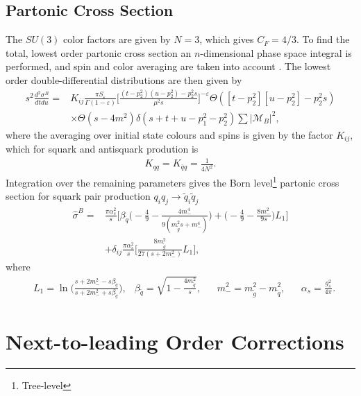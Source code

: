 \documentclass[twoside,english]{uiofysmaster}
\begin{document}
{\subsection*{Partonic Cross Section}

The $SU(3)$ color factors are given by $N=3$, which gives $C_F = 4/3$. To find the total, lowest order partonic cross section an $n$-dimensional phase space integral is performed, and spin and color averaging are taken into account \cite{beenakker1997squark}. The lowest order double-differential distributions are then given by
\begin{align}
s^2 \frac{d^2 \sigma^B}{dt du} =&  K_{ij} \frac{\pi S_{\varepsilon}}{\Gamma(1 - \varepsilon)} \Bigg[ \frac{(t-p_2^2)(u-p_2^2) - p_2^2s}{\mu^2s} \Bigg]^{- \varepsilon} \Theta ([t-p_2^2][u- p_2^2]-p_2^2s) \nonumber \\
& \times \Theta (s -4m^2) \delta (s+t+u-p_1^2 -p_2^2) \sum |\mathcal{M}_B|^2,
\end{align} 
where the averaging over initial state colours and spins is given by the factor $K_{ij}$, which for squark and antisquark prodution is \cite{beenakker1997squark}
\begin{align}
K_{qq} = K_{\bar{q}q} = \frac{1}{4 N^2}.
\end{align}
Integration over the remaining parameters gives the Born level\footnote{Tree-level} partonic cross section for squark pair production $q_iq_j \rightarrow \widetilde{q}_i \widetilde{q}_j$ \cite{beenakker1997squark}
\begin{align}\label{Eq:: susy hadron : Born term sigma}
\hat{\sigma}^B =& \frac{\pi \alpha_s^2}{s} \Bigg[\beta_{\widetilde{q}} \Big(-\frac{4}{9} - \frac{4m_-^4}{9(m_{\widetilde{g}}^2s+m_-^4)} \Big) + \Big(-\frac{4}{9}- \frac{8m_-^2}{9s} \Big) L_1 \Bigg] \nonumber \\
&+ \delta_{ij} \frac{\pi \alpha_s^2}{s} \Bigg[ \frac{8m_{\widetilde{g}}^2}{27(s+2m_-^2)} L_1 \Bigg],
\end{align}
where
\begin{align*}
&L_1 = \ln \Big( \frac{s+2m_-^2-s \beta_{\widetilde{q}}}{s+ 2m_-^2+s \beta_{\widetilde{q}}} \Big), &\beta_{\widetilde{q}} = \sqrt{1-\frac{4m_{\widetilde{q}}^2}{s}}, &&m_-^2 = m_{\widetilde{g}}^2 - m_{\widetilde{q}}^2, &&\alpha_s = \frac{g_s^2}{4 \pi}.
\end{align*}


\section{Next-to-leading Order Corrections}\label{Sec:: susy hadron : Next-to-leading Order Corrections}

}
\end{document}

